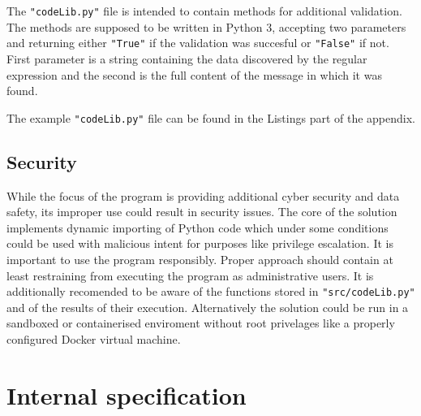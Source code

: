 \documentclass[a4paper,twoside,12pt]{book}
\begin{document}

The \lstinline|"codeLib.py"| file is intended to contain methods for additional validation. The methods are supposed
to be written in Python 3, accepting two parameters and returning either \lstinline|"True"| if the validation was succesful
or \lstinline|"False"| if not. First parameter is a string containing the data discovered by the regular expression and
the second is the full content of the message in which it was found.

The example \lstinline|"codeLib.py"| file can be found in the Listings part of the appendix.

\section{Security}

While the focus of the program is providing additional cyber security and data safety, its 
improper use could result in security issues. The core of the solution implements
dynamic importing of Python code which under some conditions could be used with malicious
intent for purposes like privilege escalation. It is important to use the program 
responsibly. Proper approach should contain at least restraining from executing
the program as administrative users. It is additionally recomended to be aware of the 
functions stored in \lstinline|"src/codeLib.py"| and of the results of their execution. Alternatively the solution could be run in a sandboxed or containerised
enviroment without root privelages like a properly configured Docker virtual machine.

\chapter{Internal specification}
\end{document}
